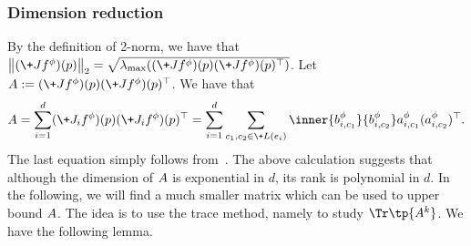 \subsubsection{Dimension reduction}\label{sec:dim}
By the definition of 2-norm, we have that $\norm{(\+J f^\phi)(\*p)}_2 = \sqrt{\lambda_{\max}( (\+J f^\phi)(\*p)(\+J f^\phi)(\*p)^\top )}$. Let $\*A := (\+J f^\phi)(\*p)(\+J f^\phi)(\*p)^\top$. We have that
\begin{align*}\label{eq:2norm_J}                 
    \*A
    = \sum_{i=1}^d  (\+J_i f^\phi)(\*p)(\+J_i f^\phi)(\*p)^\top
    = \sum_{i=1}^d \sum_{c_1,c_2\in \+L({e_i})} \inner{\*b_{i,c_1}^\phi}{\*b_{i,c_2}^\phi} \*a_{i,c_1}^\phi (\*a_{i,c_2}^\phi)^\top.
\end{align*}
The last equation simply follows from~. The above calculation suggests that although the dimension of $\*A$ is exponential in $d$, its rank is polynomial in $d$. In the following, we will find a much smaller matrix which can be used to upper bound $\*A$. The idea is to use the trace method, namely to study $\Tr\tp{\*A^k}$. We have the following lemma.


